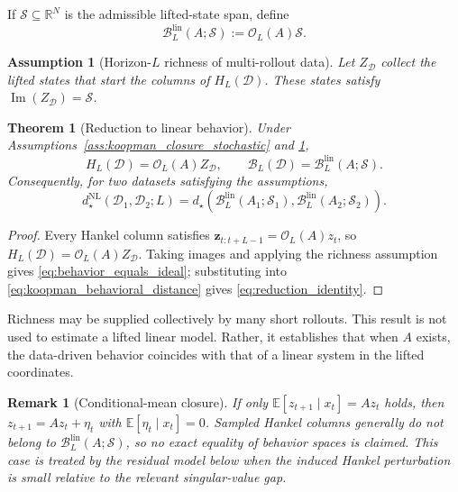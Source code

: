 \documentclass[letterpaper, 10 pt, conference]{ieeeconf}  %
\DeclareMathOperator*{\im}{Im}
\newtheorem{theorem}{Theorem}
\newtheorem{assumption}{Assumption}
\newtheorem{remark}{Remark}
\newcommand{\E}{\mathbb{E}}
\newcommand{\R}{\mathbb{R}}
\begin{document}
If $\mathcal S\subseteq\R^N$ is the admissible lifted-state span, define
\begin{equation}
  \mathcal B_L^{\mathrm{lin}}(A;\mathcal S):=\mathcal O_L(A)\mathcal S.
  \label{eq:ideal_lti_behavior}
\end{equation}

\begin{assumption}[Horizon-$L$ richness of multi-rollout data]
\label{ass:richness_multirun}
Let $Z_{\mathcal D}$ collect the lifted states that start the columns of $H_L(\mathcal D)$. These states satisfy $\im(Z_{\mathcal D})=\mathcal S$.
\end{assumption}

\begin{theorem}[Reduction to linear behavior]
\label{thm:reduction_linear}
Under Assumptions~\ref{ass:koopman_closure_stochastic} and \ref{ass:richness_multirun},
\begin{equation}
  H_L(\mathcal D)=\mathcal O_L(A)Z_{\mathcal D},\qquad
  \mathcal B_L(\mathcal D)=\mathcal B_L^{\mathrm{lin}}(A;\mathcal S).
  \label{eq:behavior_equals_ideal}
\end{equation}
Consequently, for two datasets satisfying the assumptions,
\begin{equation}
  d_\star^{\mathrm{NL}}(\mathcal D_1,\mathcal D_2;L)
  =d_\star\!\left(\mathcal B_L^{\mathrm{lin}}(A_1;\mathcal S_1),
  \mathcal B_L^{\mathrm{lin}}(A_2;\mathcal S_2)\right).
  \label{eq:reduction_identity}
\end{equation}
\end{theorem}

\begin{proof}
Every Hankel column satisfies $\mathbf z_{t:t+L-1}=\mathcal O_L(A)z_t$, so $H_L(\mathcal D)=\mathcal O_L(A)Z_{\mathcal D}$. Taking images and applying the richness assumption gives \eqref{eq:behavior_equals_ideal}; substituting into \eqref{eq:koopman_behavioral_distance} gives \eqref{eq:reduction_identity}.
\end{proof}

Richness may be supplied collectively by many short rollouts. This result is not used to estimate a lifted linear model. Rather, it establishes that when $A$ exists, the data-driven behavior coincides with that of a linear system in the lifted coordinates.

\begin{remark}[Conditional-mean closure]
If only $\E[z_{t+1}\mid x_t]=Az_t$ holds, then $z_{t+1}=Az_t+\eta_t$ with $\E[\eta_t\mid x_t]=0$. Sampled Hankel columns generally do not belong to $\mathcal B_L^{\mathrm{lin}}(A;\mathcal S)$, so no exact equality of behavior spaces is claimed. This case is treated by the residual model below when the induced Hankel perturbation is small relative to the relevant singular-value gap.
\end{remark}
\end{document}
